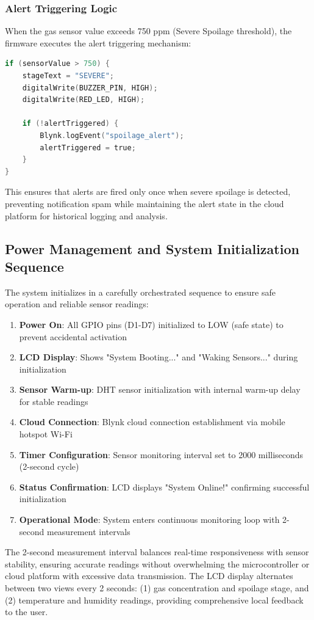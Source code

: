 \subsubsection{Alert Triggering Logic}
When the gas sensor value exceeds 750 ppm (Severe Spoilage threshold), the firmware executes the alert triggering mechanism:
\begin{lstlisting}[language=C, caption=Blynk alert triggering mechanism for severe spoilage]
if (sensorValue > 750) {
    stageText = "SEVERE";
    digitalWrite(BUZZER_PIN, HIGH);
    digitalWrite(RED_LED, HIGH);

    if (!alertTriggered) {
        Blynk.logEvent("spoilage_alert");
        alertTriggered = true;
    }
}
\end{lstlisting}

This ensures that alerts are fired only once when severe spoilage is detected, preventing notification spam while maintaining the alert state in the cloud platform for historical logging and analysis.

\subsection{Power Management and System Initialization Sequence}
The system initializes in a carefully orchestrated sequence to ensure safe operation and reliable sensor readings:
\begin{enumerate}
    \item \textbf{Power On}: All GPIO pins (D1-D7) initialized to LOW (safe state) to prevent accidental activation
    \item \textbf{LCD Display}: Shows "System Booting..." and "Waking Sensors..." during initialization
    \item \textbf{Sensor Warm-up}: DHT sensor initialization with internal warm-up delay for stable readings
    \item \textbf{Cloud Connection}: Blynk cloud connection establishment via mobile hotspot Wi-Fi
    \item \textbf{Timer Configuration}: Sensor monitoring interval set to 2000 milliseconds (2-second cycle)
    \item \textbf{Status Confirmation}: LCD displays "System Online!" confirming successful initialization
    \item \textbf{Operational Mode}: System enters continuous monitoring loop with 2-second measurement intervals
\end{enumerate}

The 2-second measurement interval balances real-time responsiveness with sensor stability, ensuring accurate readings without overwhelming the microcontroller or cloud platform with excessive data transmission. The LCD display alternates between two views every 2 seconds: (1) gas concentration and spoilage stage, and (2) temperature and humidity readings, providing comprehensive local feedback to the user.
